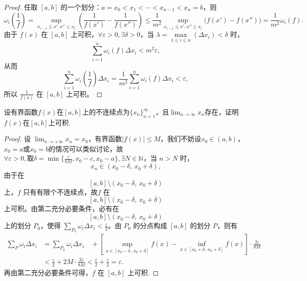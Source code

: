 \documentclass[lang=cn,12pt]{elegantbook}
\begin{document}
\begin{proof}
    任取 \([a, b]\) 的一个划分：\(a = x_0 < x_1 < \cdots < x_{n-1} < x_n = b\)，则
    \[
    \omega_i\!\left(\frac{1}{f}\right) = \sup_{x_{i-1} \le x', x'' \le x_i} \left( \frac{1}{f(x')} - \frac{1}{f(x'')} \right) 
    \le \frac{1}{m^2} \sup_{x_{i-1} \le x', x'' \le x_i} \bigl( f(x') - f(x'') \bigr) = \frac{1}{m^2} \omega_i(f).
    \]
    由于 \(f(x)\) 在 \([a, b]\) 上可积，\(\forall \varepsilon > 0, \exists \delta > 0\)，当 \(\lambda = \max\limits_{1 \le i \le n} (\Delta x_i) < \delta\) 时，
    \[
    \sum_{i=1}^n \omega_i(f) \Delta x_i < m^2 \varepsilon,
    \]
    从而
    \[
    \sum_{i=1}^n \omega_i\!\left(\frac{1}{f}\right) \Delta x_i  = \frac{1}{m^2}\sum_{i=1}^n \omega_i(f) \Delta x_i <  \varepsilon,
    \]
    所以 \(\frac{1}{f(x)}\) 在 \([a, b]\) 上可积。
\end{proof}

\begin{example}
    设有界函数$f(x)$在$[a,b]$上的不连续点为$\{x_n\}_{n = 1}^\infty $，且$\lim_{n \to \infty} x_n$存在，证明$f(x)$在$[a,b]$上可积.
\end{example}

\begin{proof}
    设 \(\lim_{n \to +\infty} x_n = x_0\)，有界函数\(|f(x)| \leq M\)，我们不妨设$x_0 \in (a,b)$，$x_0=a$或$x_0 = b$的情况可以类似讨论，故 \(\forall \varepsilon > 0, \text{取}\delta = \min\{\frac{\varepsilon}{8M},x_0-c,x_0-a\},\exists N \in \mathbb{N}\)，当 \(n > N\) 时，
\[
x_n \in \left(x_0 - \delta,\ x_0 +  \delta\right),
\]
由于在
\[
[a,b] \setminus \left(x_0 -  \delta,\ x_0 +  \delta\right)
\]
上，\(f\) 只有有限个不连续点，故\(f\) 在
\[
[a,b] \setminus \left(x_0 -  \delta,\ x_0 +  \delta\right)
\]
上可积。由第二充分必要条件，必有在
\[
[a,b] \setminus \left(x_0 -  \delta,\ x_0 +  \delta\right)
\]
上的划分 \(P_0\)，使得 \(\displaystyle \sum_{P_0} \omega_i \Delta x_i < \frac{\varepsilon}{2}\)。由 \(P_0\) 的分点构成 \([a,b]\) 的划分 \(P\)，则有
\[
\begin{aligned}
\sum_P \omega_i \Delta x_i &= \sum_{P_0} \omega_i \Delta x_i 
\quad + \left[ \sup_{x \in \left[x_0 - \delta,\ x_0 + \delta\right]} f(x) - \inf_{x \in \left[x_0 + \delta,\ x_0 +  \delta\right]} f(x) \right] \cdot \frac{2\varepsilon}{8M} \\
&< \frac{\varepsilon}{2} + 2M \cdot \frac{2\varepsilon}{8M} < \frac{\varepsilon}{2} + \frac{\varepsilon}{2} = \varepsilon.
\end{aligned}
\]
再由第二充分必要条件可得，\(f\) 在 \([a,b]\) 上可积.
\end{proof}
\end{document}
